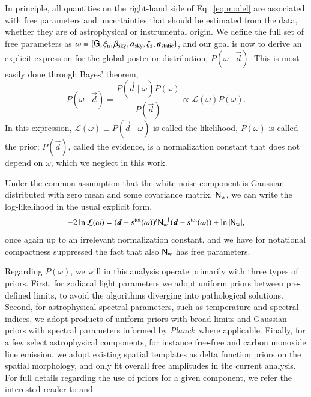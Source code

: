 \documentclass{aa}
\def\Planck{\textit{Planck}}
\newcommand{\dv}[0]{\vec{d}}
\newcommand{\G}[0]{\tens{G}}
\newcommand{\s}[0]{\vec{s}}
\renewcommand{\a}[0]{\vec{a}}
\newcommand{\N}[0]{\tens{N}}
\begin{document}
In principle, all quantities on the right-hand side of
Eq.~\eqref{eq:model} are associated with free parameters and
uncertainties that should be estimated from the data, whether they are
of astrophysical or instrumental origin. We define the full set of
free parameters as $\omega = \{\G,\xi_{\mathrm{n}},
\beta_{\mathrm{sky}},\a_{\mathrm{sky}},\zeta_{\mathrm{z}},\a_{\mathrm{static}}\}$,
and our goal is now to derive an explicit expression for the global
posterior distribution, $P(\omega\mid\dv)$. This is most easily done
through Bayes' theorem,
\begin{equation}
P(\omega\mid\dv) = \frac{P(\dv\mid\omega) P(\omega)}{P(\dv)} \propto
\mathcal{L}(\omega) P(\omega).
\end{equation}
In this expression, $\mathcal{L}(\omega) \equiv  P(\dv\mid\omega)$ is
called the likelihood, $P(\omega)$ is called the prior; $P(\dv)$, called the evidence, is a
normalization constant that does not depend on $\omega$, which we
neglect in this work.

Under the common assumption that the white noise component is Gaussian
distributed with zero mean and some covariance matrix,
$\N_{\mathrm{w}}$, we can write the log-likelihood in the usual
explicit form,
\begin{equation}
-2\ln\mathcal{L}(\omega) = (\dv-\s^{\mathrm{tot}}(\omega))^t
	\N_{\mathrm{w}}^{-1}(\dv-\s^{\mathrm{tot}}(\omega))+\ln|\N_{\mathrm w}|,
\end{equation}
once again up to an irrelevant normalization constant, and we have for
notational compactness suppressed the fact that also $\N_{\mathrm{w}}$ has free
parameters.

Regarding $P(\omega)$, we will in this analysis operate primarily with
three types of priors. First, for zodiacal light parameters we adopt
uniform priors between pre-defined limits, to avoid the algorithms
diverging into pathological solutions. Second, for
astrophysical spectral parameters, such as temperature and spectral
indices, we adopt products of uniform priors with broad limits and
Gaussian priors with spectral parameters informed by \Planck\ where
applicable. Finally, for a few select astrophysical components, for
instance free-free and carbon monoxide line emission, we adopt
existing spatial templates as delta function priors on the spatial
morphology, and only fit overall free amplitudes in the current
analysis. For full details regarding the use of priors for a given
component, we refer the interested reader to \citet{CG02_04} and \citet{CG02_05}.
\end{document}

